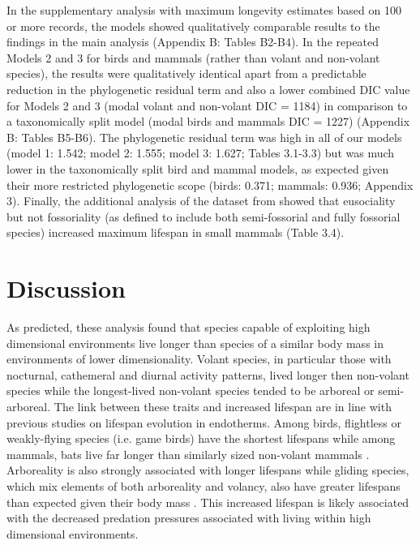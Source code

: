 In the supplementary analysis with maximum longevity estimates based on 100 or more records, the models showed qualitatively comparable results to the findings in the main analysis (Appendix B: Tables B2-B4). In the repeated Models 2 and 3 for birds and mammals (rather than volant and non-volant species), the results were qualitatively identical apart from a predictable reduction in the phylogenetic residual term and also a lower combined DIC value for Models 2 and 3 (modal volant and non-volant DIC = 1184) in comparison to a taxonomically split model (modal birds and mammals DIC  = 1227) (Appendix B: Tables B5-B6). The phylogenetic residual term was high in all of our models (model 1: 1.542; model 2: 1.555; model 3: 1.627; Tables 3.1-3.3) but was much lower in the taxonomically split bird and mammal models, as expected given their more restricted phylogenetic scope (birds: 0.371; mammals: 0.936; Appendix 3). Finally, the additional analysis of the dataset from \cite{williams2015ecology} showed that eusociality but not fossoriality (as defined to include both semi-fossorial and fully fossorial species) increased maximum lifespan in small mammals (Table 3.4).



\section{Discussion}

As predicted, these analysis found that species capable of exploiting high dimensional environments live longer than species of a similar body mass in environments of lower dimensionality. Volant species, in particular those with nocturnal, cathemeral and diurnal activity patterns, lived longer then non-volant species while the longest-lived non-volant species tended to be arboreal or semi-arboreal. The link between these traits and increased lifespan are in line with previous studies on lifespan evolution in endotherms. Among birds, flightless or weakly-flying species (i.e. game birds) have the shortest lifespans \citep{ricklefs2010life,Williams1957,wilkinson2002life} while among mammals, bats live far longer than similarly sized non-volant mammals \citep{wilkinson2002life,austad1991mammalian}. Arboreality is also strongly associated with longer lifespans \citep{shattuck2010arboreality} while gliding species, which mix elements of both arboreality and volancy, also have greater lifespans than expected given their body mass \citep{holmes1994fly}. This increased lifespan is likely associated with the decreased predation pressures associated with living within high dimensional environments.


